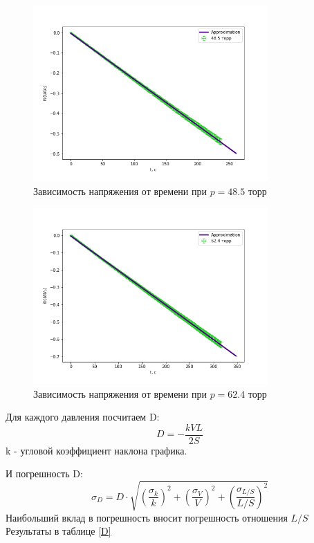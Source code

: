 \documentclass[a4paper,12pt]{article} %
\begin{document}
\begin{figure}[h!]
\begin{center}
\includegraphics[width=0.8\textwidth]{U(t)+48}
\end{center}
\caption{Зависимость напряжения от времени при $p=48.5$ торр} \label{u3}
\end{figure}

\begin{figure}[h!]
\begin{center}
\includegraphics[width=0.8\textwidth]{U(t)+62}
\end{center}
\caption{Зависимость напряжения от времени при $p=62.4$ торр} \label{u4}
\end{figure}

Для каждого давления посчитаем D:
\begin{equation}
D = -\frac{kVL}{2S}
\end{equation}
k - угловой коэффициент наклона графика.

И погрешность D:
\begin{equation}
\sigma_D = D\cdot \sqrt{(\frac{\sigma_k}{k})^2+(\frac{\sigma_V}{V})^2+(\frac{\sigma_{L/S}}{{L/S}})^2}
\end{equation}
Наибольший вклад в погрешность вносит погрешность отношения $L/S$
Результаты в таблице \ref{D}
\end{document}
